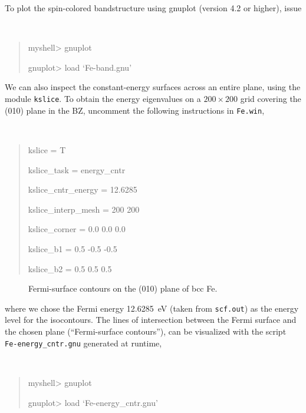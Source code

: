 \documentclass[a4paper,11pt,twoside]{article}
\begin{document}
To plot the spin-colored bandstructure using gnuplot (version 4.2 or
higher), issue
{\tt
\begin{quote}
myshell> gnuplot

gnuplot> load `Fe-band.gnu'
\end{quote} }

We can also inspect the constant-energy surfaces across an entire
plane, using the module {\tt kslice}.  To obtain the energy
eigenvalues on a $200\times 200$ grid covering the (010) plane in the
BZ, uncomment the following instructions in {\tt Fe.win}, {\tt
\begin{quote}
kslice = T

kslice\_task = energy\_cntr

kslice\_cntr\_energy = 12.6285

kslice\_interp\_mesh = 200 200

kslice\_corner = 0.0  0.0  0.0

kslice\_b1 =     0.5 -0.5 -0.5

kslice\_b2 =     0.5  0.5  0.5
\end{quote} }

\begin{figure}[h]
\begin{center}
\caption{Fermi-surface contours on the (010) plane of bcc Fe.} 
\label{fig:fe-fermicontours}
\end{center}
\end{figure}

where we chose the Fermi energy 12.6285~eV (taken from {\tt scf.out})
as the energy level for the isocontours.  The lines of intersection
between the Fermi surface and the chosen plane (``Fermi-surface
contours''), can be visualized with the script {\tt
  Fe-energy\_cntr.gnu} generated at runtime, {\tt
\begin{quote}
myshell> gnuplot

gnuplot> load `Fe-energy\_cntr.gnu'
\end{quote} }
\end{document}
